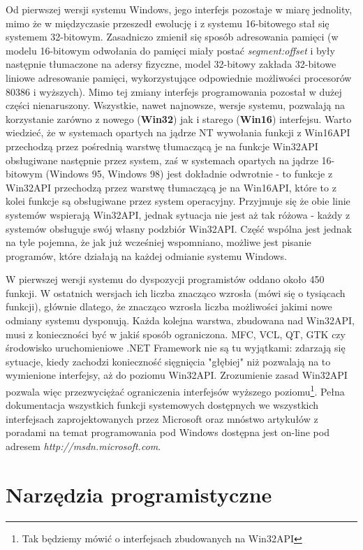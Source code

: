 Od pierwszej wersji systemu Windows, jego interfejs pozostaje w miarę jednolity, mimo że w międzyczasie
przeszedł ewolucję i z systemu 16-bitowego stał się systemem 32-bitowym. Zasadniczo zmienił się
sposób adresowania pamięci (w modelu 16-bitowym odwołania do pamięci miały postać
{\em segment:offset} i były następnie tłumaczone na adersy fizyczne, model 32-bitowy zakłada
32-bitowe liniowe adresowanie pamięci, wykorzystujące odpowiednie możliwości procesorów 80386 i wyższych).
Mimo tej zmiany interfejs programowania pozostał w dużej części nienaruszony. Wszystkie, nawet
najnowsze, wersje systemu, pozwalają na korzystanie zarówno z nowego ({\bf Win32})
jak i starego ({\bf Win16}) interfejsu. Warto wiedzieć, że w systemach opartych na jądrze NT wywołania
funkcji z Win16API przechodzą przez pośrednią warstwę tłumaczącą je na funkcje Win32API obsługiwane
następnie przez system, zaś w systemach opartych na jądrze 16-bitowym 
(Windows 95, Windows 98) jest dokładnie odwrotnie - to funkcje z Win32API przechodzą przez 
warstwę tłumaczącą je na Win16API, które to z kolei funkcje są obsługiwane przez system operacyjny. 
Przyjmuje się że obie linie systemów wspierają Win32API, jednak sytuacja nie jest aż tak różowa -
każdy z systemów obsługuje swój własny podzbiór Win32API. Część wspólna jest jednak na tyle pojemna, że
jak już wcześniej wspomniano, możliwe jest pisanie programów, które działają na każdej odmianie systemu
Windows. 

W pierwszej wersji systemu do dyspozycji programistów oddano około 450 funkcji. W ostatnich wersjach
ich liczba znacząco wzrosła (mówi się o tysiącach funkcji), głównie dlatego, że znacząco wzrosła liczba
możliwości jakimi nowe odmiany systemu dysponują. Każda kolejna warstwa, 
zbudowana nad Win32API, musi z konieczności
być w jakiś sposób ograniczona. MFC, VCL, QT, GTK czy środowisko uruchomieniowe .NET Framework{} 
nie są tu wyjątkami: zdarzają się sytuacje, kiedy zachodzi konieczność sięgnięcia "głębiej" niż pozwalają na to 
wymienione interfejsy, aż do poziomu Win32API. Zrozumienie zasad Win32API pozwala więc przezwyciężać
ograniczenia interfejsów wyższego poziomu\footnote{Tak będziemy mówić o interfejsach zbudowanych na Win32API}.
Pełna dokumentacja wszystkich funkcji systemowych dostępnych we wszystkich interfejsach zaprojektowanych
przez Microsoft oraz mnóstwo artykułów z poradami na temat programowania pod Windows dostępna
jest on-line pod adresem {\em http://msdn.microsoft.com}.

\section{Narzędzia programistyczne} 

